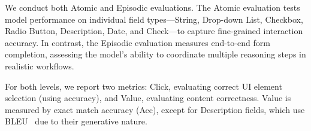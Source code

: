 \documentclass[sigconf, screen, review]{acmart}
\begin{document}
We conduct both Atomic and Episodic evaluations. The Atomic evaluation tests model performance on individual field types—String, Drop-down List, Checkbox, Radio Button, Description, Date, and Check—to capture fine-grained interaction accuracy. In contrast, the Episodic evaluation measures end-to-end form completion, assessing the model’s ability to coordinate multiple reasoning steps in realistic workflows.

For both levels, we report two metrics: Click, evaluating correct UI element selection (using accuracy), and Value, evaluating content correctness. Value is measured by exact match accuracy (Acc), except for Description fields, which use BLEU~\cite{papineni-etal-2002-bleu} due to their generative nature.




\end{document}
